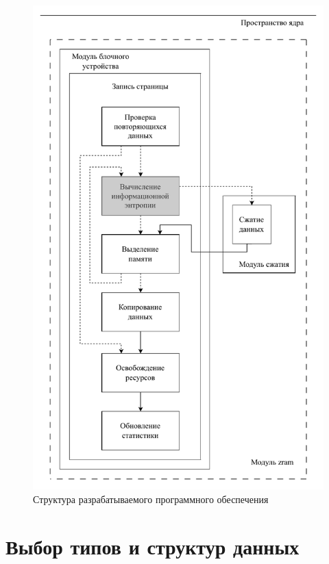 \begin{figure}[H]
	\begin{center}
		\includegraphics[scale=0.5]{inc/img/structure.pdf}
	\end{center}
	\captionsetup{justification=centering}
	\caption{Структура разрабатываемого программного обеспечения}
	\label{img:structure}
\end{figure}

\section{Выбор типов и структур данных}


